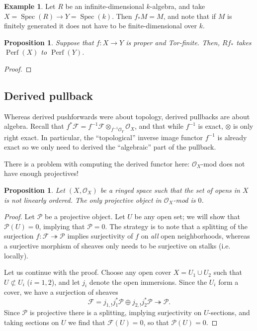 \documentclass[10pt]{article}
\newtheorem{prop}[thm]{Proposition}
\theoremstyle{definition}
\newtheorem{exmp}[thm]{Example}
\DeclareMathOperator{\Spec}{Spec}
\DeclareMathOperator{\Perf}{Perf}
\newcommand{\OO}{\mathcal{O}}
\begin{document}
\begin{exmp}
Let $R$ be an infinite-dimensional $k$-algebra, and take $X = \Spec(R) \rightarrow Y = \Spec(k)$.  Then $f_* M = M$, and note that if $M$ is finitely generated it does not have to be finite-dimensional over $k$.
\end{exmp}

\begin{prop}
Suppose that $f: X \rightarrow Y$ is proper and Tor-finite.  Then, $Rf_*$ takes $\Perf(X)$ to $\Perf(Y)$.
\end{prop}
\begin{proof}

\end{proof}



\subsection{Derived pullback}

Whereas derived pushforwards were about topology, derived pullbacks are about algebra.  Recall that $f^* \mathcal{F} = f^{-1} \mathcal{F} \otimes_{f^{-1} \OO_Y} \OO_X$, and that while $f^{-1}$ is exact, $\otimes$ is only right exact.  In particular, the ``topological'' inverse image functor $f^{-1}$ is already exact so we only need to derived the ``algebraic'' part of the pullback.


There is a problem with computing the derived functor here: $\OO_X$-mod does not have enough projectives!
\begin{prop}
Let $(X, \OO_X)$ be a ringed space such that the set of opens in $X$ is not linearly ordered.  The only projective object in $\OO_X$-mod is $0$.
\end{prop}
\begin{proof}
Let $\mathcal{P}$ be a projective object.  Let $U$ be any open set; we will show that $\mathcal{P}(U) = 0$, implying that $\mathcal{P} = 0$.  The strategy is to note that a splitting of the surjection $f: \mathcal{F} \twoheadrightarrow \mathcal{P}$ implies surjectivity of $f$ on \emph{all} open neighborhoods, whereas a surjective morphism of sheaves only needs to be surjective on stalks (i.e. locally).

Let us continue with the proof.  Choose any open cover $X = U_1 \cup U_2$ such that $U \not\subset U_i$ ($i=1,2$), and let $j_i$ denote the open immersions.  Since the $U_i$ form a cover, we have a surjection of sheaves
$$\mathcal{F} = j_{1,!} j_1^* \mathcal{P} \oplus j_{2,!} j_2^* \mathcal{P} \twoheadrightarrow \mathcal{P}.$$
Since $\mathcal{P}$ is projective there is a splitting, implying surjectivity on $U$-sections, and taking sections on $U$ we find that $\mathcal{F}(U) = 0$, so that $\mathcal{P}(U) = 0$.
\end{proof}
\end{document}
